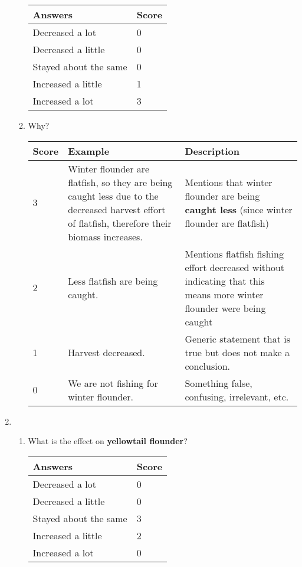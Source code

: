 \begin{enumerate}
\begin{enumerate}
\begin{tabular}{| l | l |} \hline
\rowcolor{red!35} \textbf{Answers} & \textbf{Score} \\ \hline
Decreased a lot & 0 \\ 
Decreased a little & 0 \\ 
Stayed about the same & 0 \\ 
Increased a little & 1 \\
Increased a lot & 3 \\
\hline
\end{tabular}

\item Why?

\begin{tabular}{| l | p{5.25cm} | p{5.7cm} |} \hline
\rowcolor{red!35} \textbf{Score} & \textbf{Example} & \textbf{Description} \\ \hline
3 & Winter flounder are flatfish, so they are being caught less due to the decreased harvest effort of flatfish, therefore their biomass increases. & Mentions that winter flounder are being \textbf{caught less} (since winter flounder are flatfish) \\ 
2 & Less flatfish are being caught. & Mentions flatfish fishing effort decreased without indicating that this means more winter flounder were being caught
 \\ 
1 & Harvest decreased. & Generic statement that is true but does not make a conclusion. \\ 
0 & We are not fishing for winter flounder.
 & Something false, confusing, irrelevant, etc. \\
\hline
\end{tabular}

\end{enumerate}

\item 
\begin{enumerate}
\item What is the effect on \textbf{yellowtail flounder}?

\begin{tabular}{| l | l |} \hline
\rowcolor{red!35} \textbf{Answers} & \textbf{Score} \\ \hline
Decreased a lot & 0 \\ 
Decreased a little & 0 \\ 
Stayed about the same & 3 \\ 
Increased a little & 2 \\
Increased a lot & 0 \\
\hline
\end{tabular}


\end{enumerate}
\end{enumerate}
